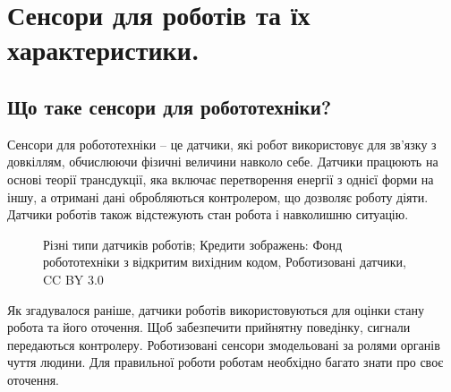 \documentclass[a4paper,14pt]{extreport}
\begin{document}
\newpage




\chapter{Сенсори для роботів та їх характеристики.}
\section{Що таке сенсори для робототехніки?}\par

 Сенсори для робототехніки -- це датчики, які робот використовує для зв'язку з довкіллям, обчислюючи фізичні величини навколо себе. Датчики працюють на основі теорії трансдукції, яка включає перетворення енергії з однієї форми на іншу, а отримані дані обробляються контролером, що дозволяє роботу діяти. Датчики роботів також відстежують стан робота і навколишню ситуацію.\\

\begin{figure}[h!]
   \caption{Різні типи датчиків роботів; Кредити зображень: Фонд робототехніки з відкритим вихідним кодом, Роботизовані датчики, CC BY 3.0}
 \end{figure}

   Як згадувалося раніше, датчики роботів використовуються для оцінки стану робота та його оточення. Щоб забезпечити прийнятну поведінку, сигнали передаються контролеру. Роботизовані сенсори змодельовані за ролями органів чуття людини. Для правильної роботи роботам необхідно багато знати про своє оточення.
 
\end{document}
